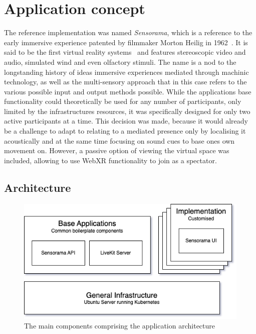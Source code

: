 \chapter{Application concept}
\label{ch:concept}

The reference implementation was named \emph{Sensorama}, which is a reference to the early immersive experience patented by filmmaker Morton Heilig in 1962~\parencite{Heilig_1962}.
It is said to be the first virtual reality systems~\parencite[5][]{vrHistoryGigante} and features stereoscopic video and audio, simulated wind and even olfactory stimuli.
The name is a nod to the longstanding history of ideas immersive experiences mediated through machinic technology, as well as the multi-sensory approach that in this case refers to the various possible input and output methods possible.
While the application\textquotesingle s base functionality could theoretically be used for any number of participants, only limited by the infrastructure\textquotesingle s resources, it was specifically designed for only two active participants at a time.
This decision was made, because it would already be a challenge to adapt to relating to a mediated presence only by localising it acoustically and at the same time focusing on sound cues to base one\textquotesingle s own movement on.
However, a passive option of viewing the virtual space was included, allowing to use \ac{WebXR} functionality to join as a spectator.

\section{Architecture}
\label{sec:architecture}

\begin{figure}[h]
\centering
\includegraphics[scale=0.5]{04_Artefakte/01_Abbildungen/sensorama-stack}
\caption[Sensorama stack diagram]{The main components comprising the application architecture\protect}
\label{fig:sensoramaStack}
\end{figure}

